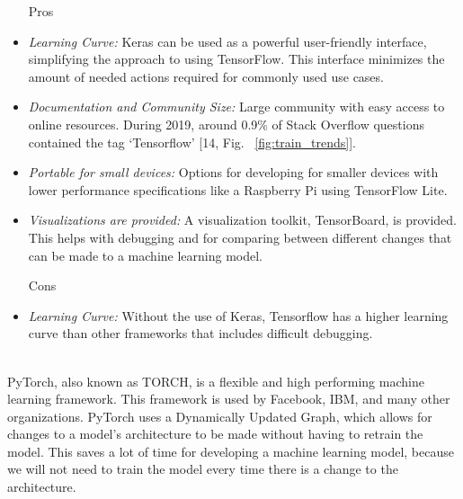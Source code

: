 \documentclass[12pt,journal,compsoc]{IEEEtran}
\newenvironment{subs}
  {\adjustwidth{1em}{0pt}}
  {\endadjustwidth}
\begin{document}
\begin{subs}
\begin{subs}
\begin{subs}
\begin{subs}
\begin{itemize}
    \item [{Pros}]
    \item \emph{Learning Curve:} Keras can be used as a powerful user-friendly interface, simplifying the approach to using TensorFlow. This interface minimizes the amount of needed actions required for commonly used use cases.
    \item \emph{Documentation and Community Size:} Large community with easy access to online resources. During 2019, around 0.9\% of Stack Overflow questions contained the tag ‘Tensorflow’ [14, Fig. ~\ref{fig:train_trends}].
    \item \emph{Portable for small devices:} Options for developing for smaller devices with lower performance specifications like a Raspberry Pi using TensorFlow Lite.
    \item \emph{Visualizations are provided:} A visualization toolkit, TensorBoard, is provided. This helps with debugging and for comparing between different changes that can be made to a machine learning model.
    \item [{Cons}]
    \item \emph{Learning Curve:} Without the use of Keras, Tensorflow has a higher learning curve than other frameworks that includes difficult debugging.
\end{itemize}
\end{subs}

\\
PyTorch, also known as TORCH, is a flexible and high performing machine learning framework. This framework is used by Facebook, IBM, and many other organizations. PyTorch uses a Dynamically Updated Graph, which allows for changes to a model’s architecture to be made without having to retrain the model. This saves a lot of time for developing a machine learning model, because we will not need to train the model every time there is a change to the architecture.


\end{subs}
\end{subs}
\end{subs}
\end{document}
